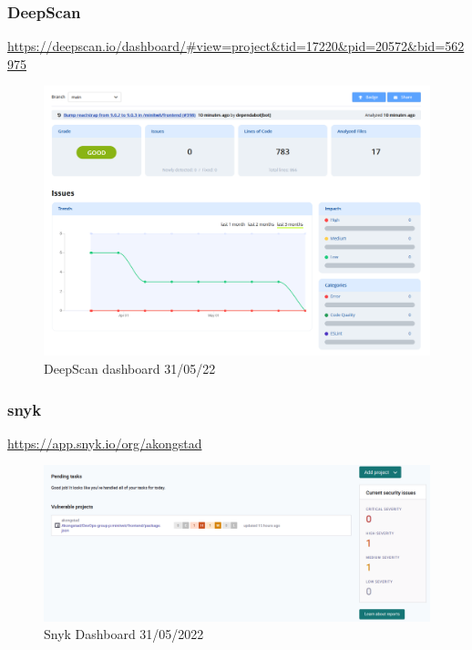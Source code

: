 \subsubsection{DeepScan}
\label{app:codeAnalDeep}
\href{https://deepscan.io/dashboard/\#view=project\&tid=17220\&pid=20572\&bid=562975}{https://deepscan.io/dashboard/\#view=project\&tid=17220\&pid=20572\&bid=562975}
\begin {figure}[H]
    \centering
    \includegraphics[scale=0.40]{images/analysis_tools/deepscan.PNG}
    \caption{DeepScan dashboard 31/05/22}
    \label{fig:deepscan}
\end{figure}

\subsubsection{snyk}
\label{app:codeAnalSnyk}
\href{https://app.snyk.io/org/akongstad}{https://app.snyk.io/org/akongstad}
\begin {figure}[H]
    \centering
    \includegraphics[scale=0.40]{images/analysis_tools/snykDashboard.PNG}
    \caption{Snyk Dashboard 31/05/2022}
    \label{fig:snykAlert}
\end{figure}

